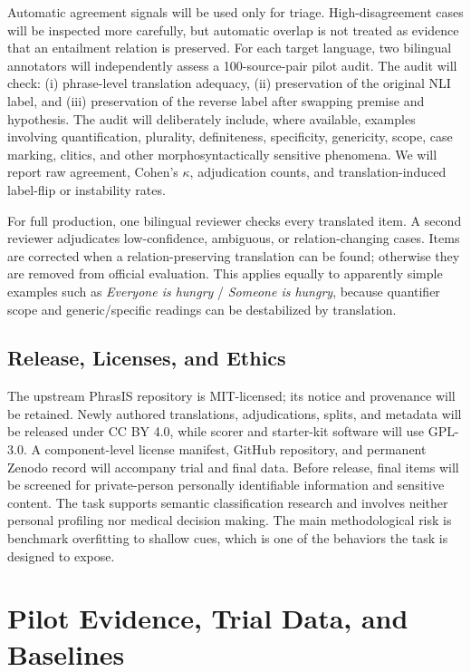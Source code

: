 \documentclass[11pt]{article}
\begin{document}
Automatic agreement signals will be used only for triage.
High-disagreement cases will be inspected more carefully, but automatic overlap is not treated as evidence that an entailment relation is preserved.
For each target language, two bilingual annotators will independently assess a 100-source-pair pilot audit.
The audit will check: (i) phrase-level translation adequacy, (ii) preservation of the original NLI label, and (iii) preservation of the reverse label after swapping premise and hypothesis.
The audit will deliberately include, where available, examples involving quantification, plurality, definiteness, specificity, genericity, scope, case marking, clitics, and other morphosyntactically sensitive phenomena.
We will report raw agreement, Cohen's $\kappa$, adjudication counts, and translation-induced label-flip or instability rates.

For full production, one bilingual reviewer checks every translated item.
A second reviewer adjudicates low-confidence, ambiguous, or relation-changing cases.
Items are corrected when a relation-preserving translation can be found; otherwise they are removed from official evaluation.
This applies equally to apparently simple examples such as \emph{Everyone is hungry} / \emph{Someone is hungry}, because quantifier scope and generic/specific readings can be destabilized by translation.

\subsection{Release, Licenses, and Ethics}

The upstream PhrasIS repository is MIT-licensed; its notice and provenance will be retained.
Newly authored translations, adjudications, splits, and metadata will be released under CC BY 4.0, while scorer and starter-kit software will use GPL-3.0.
A component-level license manifest, GitHub repository, and permanent Zenodo record will accompany trial and final data.
Before release, final items will be screened for private-person personally identifiable information and sensitive content.
The task supports semantic classification research and involves neither personal profiling nor medical decision making.
The main methodological risk is benchmark overfitting to shallow cues, which is one of the behaviors the task is designed to expose.

\section{Pilot Evidence, Trial Data, and Baselines}
\end{document}
